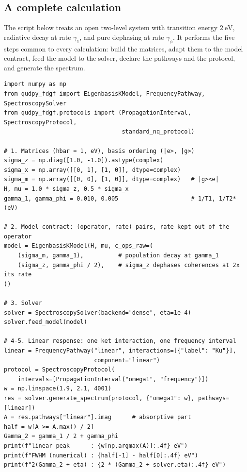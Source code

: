 \documentclass[11pt]{article}
\begin{document}
\subsection{A complete calculation}
The script below treats an open two-level system with transition energy $2~\mathrm{eV}$, radiative decay at rate $\gamma_1$, and pure dephasing at rate $\gamma_\phi$. It performs the five steps common to every calculation: build the matrices, adapt them to the model contract, feed the model to the solver, declare the pathways and the protocol, and generate the spectrum.
\begin{verbatim}
import numpy as np
from qudpy_fdgf import EigenbasisKModel, FrequencyPathway, SpectroscopySolver
from qudpy_fdgf.protocols import (PropagationInterval, SpectroscopyProtocol,
                                  standard_nq_protocol)

# 1. Matrices (hbar = 1, eV), basis ordering (|e>, |g>)
sigma_z = np.diag([1.0, -1.0]).astype(complex)
sigma_x = np.array([[0, 1], [1, 0]], dtype=complex)
sigma_m = np.array([[0, 0], [1, 0]], dtype=complex)   # |g><e|
H, mu = 1.0 * sigma_z, 0.5 * sigma_x
gamma_1, gamma_phi = 0.010, 0.005                     # 1/T1, 1/T2* (eV)

# 2. Model contract: (operator, rate) pairs, rate kept out of the operator
model = EigenbasisKModel(H, mu, c_ops_raw=(
    (sigma_m, gamma_1),          # population decay at gamma_1
    (sigma_z, gamma_phi / 2),    # sigma_z dephases coherences at 2x its rate
))

# 3. Solver
solver = SpectroscopySolver(backend="dense", eta=1e-4)
solver.feed_model(model)

# 4-5. Linear response: one ket interaction, one frequency interval
linear = FrequencyPathway("linear", interactions=[{"label": "Ku"}],
                          component="linear")
protocol = SpectroscopyProtocol(
    intervals=[PropagationInterval("omega1", "frequency")])
w = np.linspace(1.9, 2.1, 4001)
res = solver.generate_spectrum(protocol, {"omega1": w}, pathways=[linear])
A = res.pathways["linear"].imag      # absorptive part
half = w[A >= A.max() / 2]
Gamma_2 = gamma_1 / 2 + gamma_phi
print(f"linear peak      : {w[np.argmax(A)]:.4f} eV")
print(f"FWHM (numerical) : {half[-1] - half[0]:.4f} eV")
print(f"2(Gamma_2 + eta) : {2 * (Gamma_2 + solver.eta):.4f} eV")


\end{verbatim}
\end{document}
